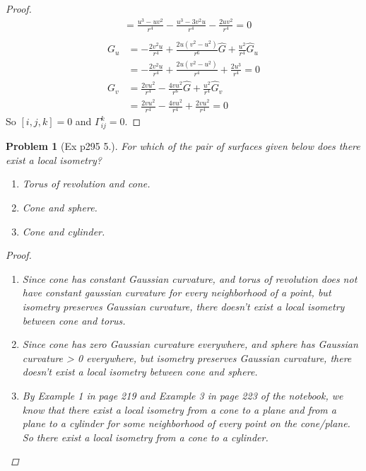 \documentclass[10pt,a4paper]{article}
\newcounter{theProblemCounter}
\newtheorem{problem}[theProblemCounter]{Problem}
\begin{document}
\begin{proof}
\begin{align*}
&=\frac{u^3-uv^2}{r^4}-\frac{u^3-3v^2u}{r^4}-\frac{2uv^2}{r^4}=0\\
\end{align*}
\begin{align*}
G_u&=-\frac{2v^2u}{r^4}+\frac{2u(v^2-u^2)}{r^6}\hat{G}+\frac{u^2}{r^4}\hat{G}_u\\
&=-\frac{2v^2u}{r^4}+\frac{2u(v^2-u^2)}{r^4}+\frac{2u^3}{r^4}=0\\
G_v&=\frac{2vu^2}{r^4}-\frac{4vu^2}{r^6}\hat{G}+\frac{u^2}{r^4}\hat{G}_v\\
&=\frac{2vu^2}{r^4}-\frac{4vu^2}{r^4}+\frac{2vu^2}{r^4}=0
\end{align*}
So $[i,j,k]=0$ and $\Gamma_{ij}^k=0$.
\end{proof}

\setcounter{theProblemCounter}{4}
\begin{problem}[Ex p295 5.]
For which of the pair of surfaces given below does there exist a local isometry?
\begin{enumerate}
\item[(a)] Torus of revolution and cone.
\item[(b)] Cone and sphere.
\item[(c)] Cone and cylinder.
\end{enumerate}
\begin{proof}
\begin{enumerate}
\item[(a)]
Since cone has constant Gaussian curvature, and torus of revolution does not have constant gaussian curvature for every neighborhood of a point, but isometry preserves Gaussian curvature, there doesn't exist a local isometry between cone and torus.
\item[(b)]
Since cone has zero Gaussian curvature everywhere, and sphere has Gaussian curvature > 0 everywhere, but isometry preserves Gaussian curvature, there doesn't exist a local isometry between cone and sphere.
\item[(c)]
By Example 1 in page 219 and Example 3 in page 223 of the notebook, we know that there exist a local isometry from a cone to a plane and from a plane to a cylinder for some neighborhood of every point on the cone/plane. So there exist a local isometry from a cone to a cylinder.
\end{enumerate}
\end{proof}
\end{problem}
\end{document}
